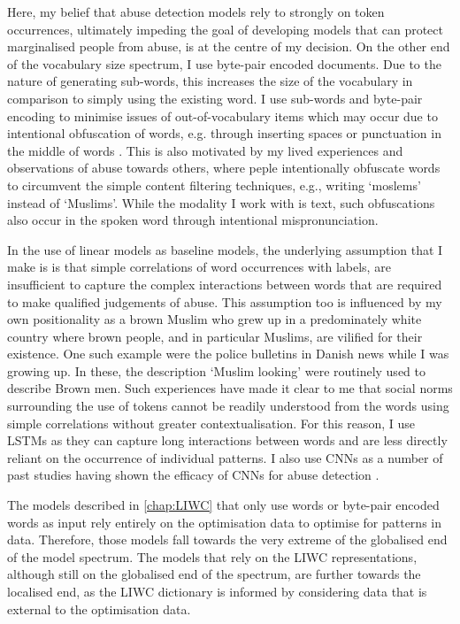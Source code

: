 {Here, my belief that abuse detection models rely to strongly on token occurrences, ultimately impeding the goal of developing models that can protect marginalised people from abuse, is at the centre of my decision.
On the other end of the vocabulary size spectrum, I use byte-pair encoded documents.
Due to the nature of generating sub-words, this increases the size of the vocabulary in comparison to simply using the existing word.
I use sub-words and byte-pair encoding to minimise issues of out-of-vocabulary items which may occur due to intentional obfuscation of words, e.g. through inserting spaces or punctuation in the middle of words \citep{Rottger:2021}.
This is also motivated by my lived experiences and observations of abuse towards others, where peple intentionally obfuscate words to circumvent the simple content filtering techniques, e.g., writing `moslems' instead of `Muslims'.
While the modality I work with is text, such obfuscations also occur in the spoken word through intentional mispronunciation.

In the use of linear models as baseline models, the underlying assumption that I make is is that simple correlations of word occurrences with labels, are insufficient to capture the complex interactions between words that are required to make qualified judgements of abuse.
This assumption too is influenced by my own positionality as a brown Muslim who grew up in a predominately white country where brown people, and in particular Muslims, are vilified for their existence.
One such example were the police bulletins in Danish news while I was growing up.
In these, the description `Muslim looking' were routinely used to describe Brown men.
Such experiences have made it clear to me that social norms surrounding the use of tokens cannot be readily understood from the words using simple correlations without greater contextualisation.
For this reason, I use LSTMs as they can capture long interactions between words and are less directly reliant on the occurrence of individual patterns.
I also use CNNs as a number of past studies having shown the efficacy of CNNs for abuse detection \citep{Park:2017, Mitchell:2019,Kolhatkar:2020,Rizwan:2020,Safaya:2020,Gamback:2017}.

The models described in \autoref{chap:LIWC} that only use words or byte-pair encoded words as input rely entirely on the optimisation data to optimise for patterns in data.
Therefore, those models fall towards the very extreme of the globalised end of the model spectrum.
The models that rely on the LIWC representations, although still on the globalised end of the spectrum, are further towards the localised end, as the LIWC dictionary is informed by considering data that is external to the optimisation data.

}
